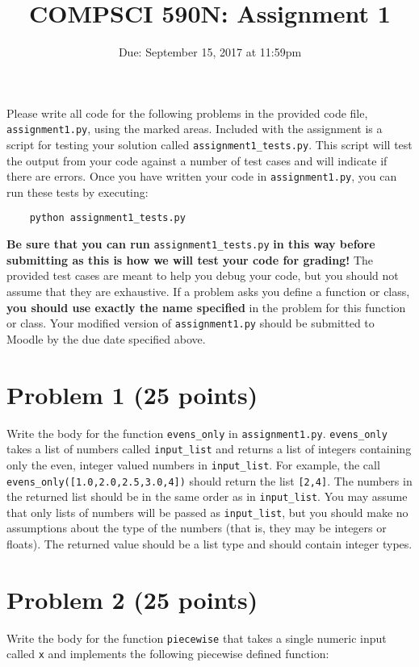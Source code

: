 \documentclass[11pt]{article} %
\title{COMPSCI 590N: Assignment 1}
\date{Due: September 15, 2017 at 11:59pm}
\begin{document}
\thispagestyle{empty}
\pagestyle{empty}

\maketitle

Please write all code for the following problems in the provided code file, \verb|assignment1.py|, using the marked areas. Included with the assignment is a script for testing your solution called \verb|assignment1_tests.py|. This script will test the output from your code against a number of test cases and will indicate if there are errors. Once you have written your code in \verb|assignment1.py|, you can run these tests by executing:

\begin{verbatim}
	python assignment1_tests.py
\end{verbatim}

\textbf{Be sure that you can run} \verb|assignment1_tests.py| \textbf{in this way before submitting as this is how we will test your code for grading!} The provided test cases are meant to help you debug your code, but you should not assume that they are exhaustive. If a problem asks you define a function or class, \textbf{you should use exactly the name specified} in the problem for this function or class. Your modified version of \verb|assignment1.py| should be submitted to Moodle by the due date specified above. 

\section*{Problem 1 (25 points)}
Write the body for the function \verb|evens_only| in \verb|assignment1.py|. \verb|evens_only| takes a list of numbers called \verb|input_list| and returns a list of integers containing only the even, integer valued numbers in \verb|input_list|. For example, the call \verb|evens_only([1.0,2.0,2.5,3.0,4])| should return the list \verb|[2,4]|. The numbers in the returned list should be in the same order as in \verb|input_list|. You may assume that only lists of numbers will be passed as \verb|input_list|, but you should make no assumptions about the type of the numbers (that is, they may be integers or floats). The returned value should be a list type and should contain integer types.

\section*{Problem 2 (25 points)}
Write the body for the function \verb|piecewise| that takes a single numeric input called \verb|x| and implements the following piecewise defined function:
\end{document}
